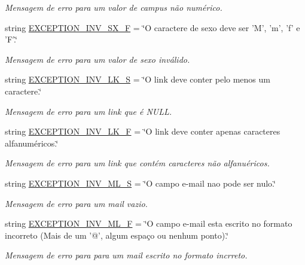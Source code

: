 \begin{DoxyCompactItemize}
\begin{DoxyCompactList}\small\item\em Mensagem de erro para um valor de campus não numérico. \end{DoxyCompactList}\item 
string \hyperlink{namespaceELO_1_1lang_1_1pt__br_aef1ca456be5da2eb76813d8fe3e16a77}{E\-X\-C\-E\-P\-T\-I\-O\-N\-\_\-\-I\-N\-V\-\_\-\-S\-X\-\_\-\-F} = \char`\"{}O caractere de sexo deve ser 'M', 'm', 'f' e 'F'.\char`\"{}
\begin{DoxyCompactList}\small\item\em Mensagem de erro para um valor de sexo inválido. \end{DoxyCompactList}\item 
string \hyperlink{namespaceELO_1_1lang_1_1pt__br_ab858646bddd566c0593f3787997a459c}{E\-X\-C\-E\-P\-T\-I\-O\-N\-\_\-\-I\-N\-V\-\_\-\-L\-K\-\_\-\-S} = \char`\"{}O link deve conter pelo menos um caractere.\char`\"{}
\begin{DoxyCompactList}\small\item\em Mensagem de erro para um link que é N\-U\-L\-L. \end{DoxyCompactList}\item 
string \hyperlink{namespaceELO_1_1lang_1_1pt__br_ac80c2fa8182d4fcfd98a0aa7ee2fc242}{E\-X\-C\-E\-P\-T\-I\-O\-N\-\_\-\-I\-N\-V\-\_\-\-L\-K\-\_\-\-F} = \char`\"{}O link deve conter apenas caracteres alfanuméricos.\char`\"{}
\begin{DoxyCompactList}\small\item\em Mensagem de erro para um link que contém caracteres não alfanuéricos. \end{DoxyCompactList}\item 
string \hyperlink{namespaceELO_1_1lang_1_1pt__br_aebc52db367f49633fb2545dcf40a7fac}{E\-X\-C\-E\-P\-T\-I\-O\-N\-\_\-\-I\-N\-V\-\_\-\-M\-L\-\_\-\-S} = \char`\"{}O campo e-\/mail nao pode ser nulo.\char`\"{}
\begin{DoxyCompactList}\small\item\em Mensagem de erro para um mail vazio. \end{DoxyCompactList}\item 
string \hyperlink{namespaceELO_1_1lang_1_1pt__br_a5e0ecb7f139a6c31415c68ad2b1ffaed}{E\-X\-C\-E\-P\-T\-I\-O\-N\-\_\-\-I\-N\-V\-\_\-\-M\-L\-\_\-\-F} = \char`\"{}O campo e-\/mail esta escrito no formato incorreto (Mais de um '@', algum espaço ou nenhum ponto).\char`\"{}
\begin{DoxyCompactList}\small\item\em Mensagem de erro para para um mail escrito no formato incrreto. \end{DoxyCompactList}\item 

\end{DoxyCompactItemize}
